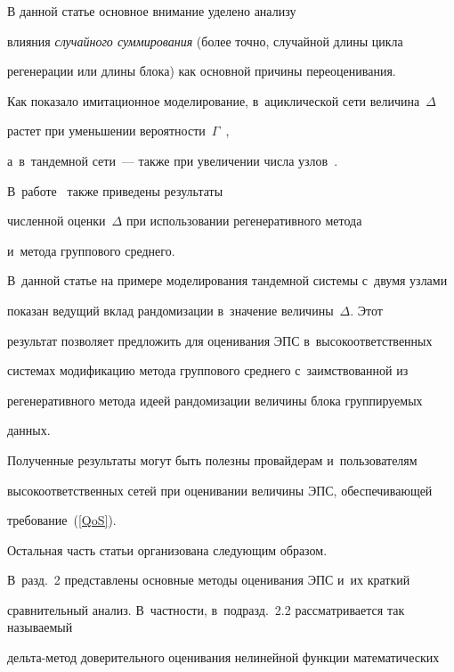 В данной статье основное внимание уделено  анализу


влияния {\it случайного суммирования} (более точно, случайной длины цикла 


регенерации или длины блока) как основной причины переоценивания.





Как показало  имитационное моделирование,  в~ациклической сети величина~$\Delta$  


растет при уменьшении вероятности~$\Gamma$~\cite{Varna,ICUMT}, 


а~в~тандемной сети~--- также  при  увеличении числа  узлов~\cite{EB14}. 


В~работе~\cite{ICUMT} также приведены результаты


 численной оценки~$\Delta$ при использовании  регенеративного метода 


 и~метода группового среднего.





  В~данной  статье на примере моделирования  тандемной системы с~двумя узлами


     показан ведущий вклад  рандомизации в~значение  величины~$\Delta$. Этот  


результат позволяет предложить для  оценивания ЭПС в~высокоответственных 


системах модификацию метода группового среднего с~заимствованной из 


регенеративного метода   идеей рандомизации  величины  блока группируемых  


данных.





    Полученные   результаты   могут быть полезны  провайдерам  и~пользователям 


высокоответственных сетей при оценивании   величины  ЭПС, обеспечивающей 


требование~(\ref{QoS}).





 Остальная часть статьи организована следующим образом.


В~разд.~2 пред\-став\-ле\-ны основные методы оценивания ЭПС и~их краткий 


сравнительный анализ. В~частности, в~подразд.~2.2 рассматривается так называемый 


дель\-та-ме\-тод  доверительного оценивания нелинейной функции математических 


